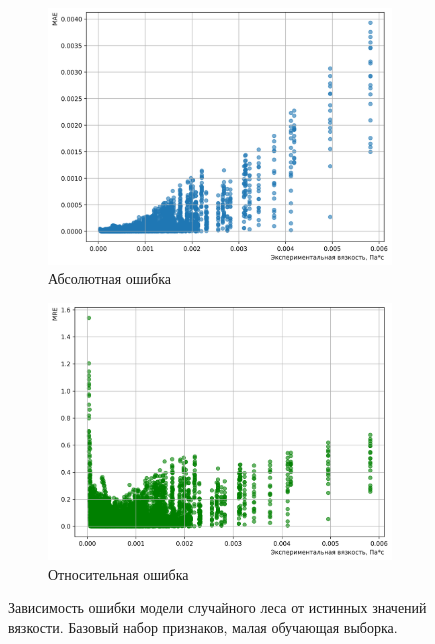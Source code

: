 \documentclass[a4paper,12pt]{article}
\begin{document}
    \begin{figure}[ht!]
      \centering
      \begin{subfigure}{0.48\textwidth}
          \centering
          \includegraphics[width=\linewidth]{random_forest/MAE_Random Forest Model_0.8_base.png}
          \caption{Абсолютная ошибка}
      \end{subfigure}
      \hfill
      \begin{subfigure}{0.48\textwidth}
          \centering
          \includegraphics[width=\linewidth]{random_forest/MRE_Random Forest Model_0.8_base.png}
          \caption{Относительная ошибка}
      \end{subfigure}
      \caption{Зависимость ошибки модели случайного леса от истинных значений вязкости. Базовый набор признаков, малая обучающая выборка.}
      \label{fig:random_forest_errors_08_base}
    \end{figure}
    
\end{document}
